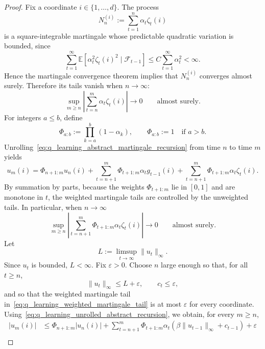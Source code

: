 \documentclass[10pt,a4paper]{amsart}
\newcommand{\E}{\mathbb E}
\newcommand{\cF}{\mathcal{F}}
\newcommand{\norm}[1]{\|#1\|}
\renewcommand{\epsilon}{\varepsilon}
\begin{document}
\begin{proof}
Fix a coordinate \(i\in\{1,\ldots,d\}\). The process
\[
    N_n^{(i)}:=\sum_{t=1}^{n}\alpha_t\zeta_t(i)
\]
is a square-integrable martingale whose predictable quadratic variation is bounded, since
\[
    \sum_{t=1}^{\infty}
    \E[\alpha_t^2\zeta_t(i)^2\mid\cF_{t-1}]
    \le
    C\sum_{t=1}^{\infty}\alpha_t^2
    <
    \infty.
\]
Hence the martingale convergence theorem implies that \(N_n^{(i)}\) converges almost surely. Therefore its tails vanish when \(n\rightarrow\infty\):
\begin{equation}
\label{eq:q_learning_unweighted_martingale_tail}
    \sup_{m\ge n}
    \left|
    \sum_{t=n}^{m}\alpha_t\zeta_t(i)
    \right|
    \longrightarrow0
    \qquad
    \text{almost surely.}
\end{equation}
For integers \(a\le b\), define
\[
    \Phi_{a:b}:=\prod_{k=a}^{b}(1-\alpha_k),
    \qquad
    \Phi_{a:b}:=1\quad\text{if }a>b.
\]
Unrolling~\eqref{eq:q_learning_abstract_martingale_recursion} from time \(n\) to time \(m\) yields
\begin{equation}
\label{eq:q_learning_unrolled_abstract_recursion}
    u_m(i)
    =
    \Phi_{n+1:m}u_n(i)
    +
    \sum_{t=n+1}^{m}\Phi_{t+1:m}\alpha_t g_{t-1}(i)
    +
    \sum_{t=n+1}^{m}\Phi_{t+1:m}\alpha_t\zeta_t(i).
\end{equation}
By summation by parts, because the weights \(\Phi_{t+1:m}\) lie in \([0,1]\) and are monotone in \(t\), the weighted martingale tails are controlled by the unweighted tails. In particular, when \(n\rightarrow\infty\)
\begin{equation}
\label{eq:q_learning_weighted_martingale_tail}
    \sup_{m\ge n}
    \left|
    \sum_{t=n+1}^{m}\Phi_{t+1:m}\alpha_t\zeta_t(i)
    \right|
    \longrightarrow0
    \qquad
    \text{almost surely.}
\end{equation}
Let
\[
    L:=\limsup_{t\to\infty}\norm{u_t}_\infty.
\]
Since \(u_t\) is bounded, \(L<\infty\). Fix \(\epsilon>0\). Choose \(n\) large enough so that, for all \(t\ge n\),
\[
    \norm{u_t}_\infty\le L+\epsilon,
    \qquad
    c_t\le\epsilon,
\]
and so that the weighted martingale tail in~\eqref{eq:q_learning_weighted_martingale_tail} is at most \(\epsilon\) for every coordinate. Using~\eqref{eq:q_learning_unrolled_abstract_recursion}, we obtain, for every \(m\ge n\),
\begin{align*}
    |u_m(i)|
    &\le
    \Phi_{n+1:m}|u_n(i)|
    +
    \sum_{t=n+1}^{m}\Phi_{t+1:m}\alpha_t
    \left(\beta\norm{u_{t-1}}_\infty+c_{t-1}\right)
    +
    \epsilon
    \\

\end{align*}
\end{proof}
\end{document}

